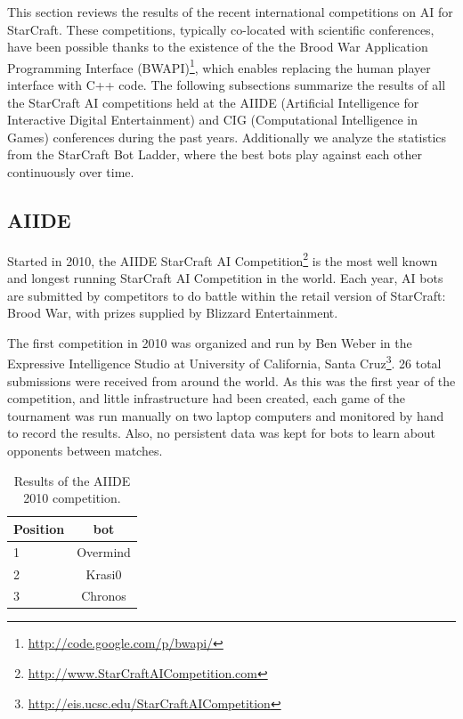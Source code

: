 \documentclass[journal]{IEEEtran}
\begin{document}
This section reviews the results of the recent international competitions on AI for StarCraft. These competitions, typically co-located with scientific conferences, have been possible thanks to the existence of the the 
Brood War Application Programming Interface 
(BWAPI)\footnote{\url{http://code.google.com/p/bwapi/}}, which 
enables replacing the human player interface with C++ code.
The following subsections summarize the results of all the StarCraft AI competitions held at the AIIDE (Artificial Intelligence for Interactive Digital Entertainment) and CIG (Computational Intelligence in Games) conferences during the past years. Additionally we analyze the statistics from the StarCraft Bot Ladder, where the best bots play against each other continuously over time. 

\subsection{AIIDE}\label{sec:AIIDE}

Started in 2010, the AIIDE StarCraft AI Competition\footnote{\url{http://www.StarCraftAICompetition.com}} is the most
well known and longest running StarCraft AI Competition in the world. Each year,
AI bots are submitted by competitors to do battle within the retail version of
StarCraft: Brood War, with prizes supplied by Blizzard Entertainment. %


The first competition in 2010 was organized and run by Ben Weber in the Expressive
Intelligence Studio at University of California, Santa Cruz\footnote{\url{http://eis.ucsc.edu/StarCraftAICompetition}}. 26 total submissions
were received from around the world. As this was the first year of the competition,
and little infrastructure had been created, each game of the tournament was run 
manually on two laptop computers and monitored by hand to record the results. Also,
no persistent data was kept for bots to learn about opponents between matches.


\begin{table}[t!]
\caption{Results of the AIIDE 2010 competition.}
\label{tab:aiide2010}
\begin{small}
\begin{center}
\begin{tabular}{|l|c|}
\hline
Position & bot\\ \hline
1 & Overmind \\
2 & Krasi0 \\
3 & Chronos \\ \hline
\end{tabular}
\end{center}
\end{small}
\end{table}
\end{document}
